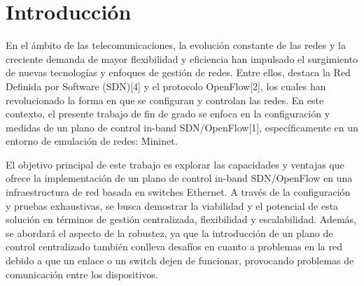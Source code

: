 \documentclass[a4paper, 12pt]{book}
\begin{document}
	
	
	\tableofcontents 
	\cleardoublepage
	\listoffigures %
	
	
	
	\clearpage
	\chapter{Introducción}
	\label{sec:intro} %
	
	
	En el ámbito de las telecomunicaciones, la evolución constante de las redes y la creciente demanda de mayor flexibilidad y eficiencia han impulsado el surgimiento de nuevas tecnologías y enfoques de gestión de redes. Entre ellos, destaca la Red Definida por Software (SDN)[4] y el protocolo OpenFlow[2], los cuales han revolucionado la forma en que se configuran y controlan las redes. En este contexto, el presente trabajo de fin de grado se enfoca en la configuración y medidas de un plano de control in-band SDN/OpenFlow[1], específicamente en un entorno de emulación de redes: Mininet.
	
	El objetivo principal de este trabajo es explorar las capacidades y ventajas que ofrece la implementación de un plano de control in-band SDN/OpenFlow en una infraestructura de red basada en switches Ethernet. A través de la configuración y pruebas exhaustivas, se busca demostrar la viabilidad y el potencial de esta solución en términos de gestión centralizada, flexibilidad y escalabilidad. Además, se abordará el aspecto de la robustez, ya que la introducción de un plano de control centralizado también conlleva desafíos en cuanto a problemas en la red debido a que un enlace o un switch dejen de funcionar, provocando problemas de comunicación entre los dispositivos.
	
\end{document}
